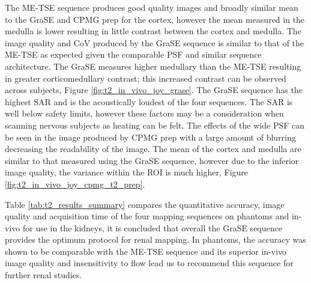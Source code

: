 The \ac{ME-TSE} sequence produces good quality images and broadly similar mean \ttwo to the \ac{GraSE} and \ac{CPMG} \ttwo prep for the cortex, however the mean \ttwo measured in the medulla is lower resulting in little contrast between the cortex and medulla. The image quality  and \ac{CoV} produced by the \ac{GraSE} sequence is similar to that of the \ac{ME-TSE} as expected given the comparable \ac{PSF} and similar sequence architecture. The \ac{GraSE} measures higher medullary \ttwo than the \ac{ME-TSE} resulting in greater corticomedullary contrast; this increased contrast can be observed across subjects, Figure \ref{fig:t2_in_vivo_joy_grase}. The \ac{GraSE} sequence has the highest \ac{SAR} and is the acoustically loudest of the four sequences. The \ac{SAR} is well below safety limits, however these factors may be a consideration when scanning nervous subjects as heating can be felt. The effects of the wide \ac{PSF} can be seen in the image produced by \ac{CPMG} \ttwo prep with a large amount of blurring decreasing the readability of the image. The mean \ttwo of the cortex and medulla are similar to that measured using the \ac{GraSE} sequence, however due to the inferior image quality, the variance within the \ac{ROI} is much higher, Figure \ref{fig:t2_in_vivo_joy_cpmg_t2_prep}.

Table \ref{tab:t2_results_summary} compares the quantitative accuracy, image quality and acquisition time of the four \ttwo mapping sequences on phantoms and in-vivo for use in the kidneys, it is concluded that overall the \ac{GraSE} sequence provides the optimum protocol for renal \ttwo mapping. In phantoms, the accuracy was shown to be comparable with the \ac{ME-TSE} sequence and its superior in-vivo image quality and insensitivity to flow lead us to recommend this sequence for further renal studies.

